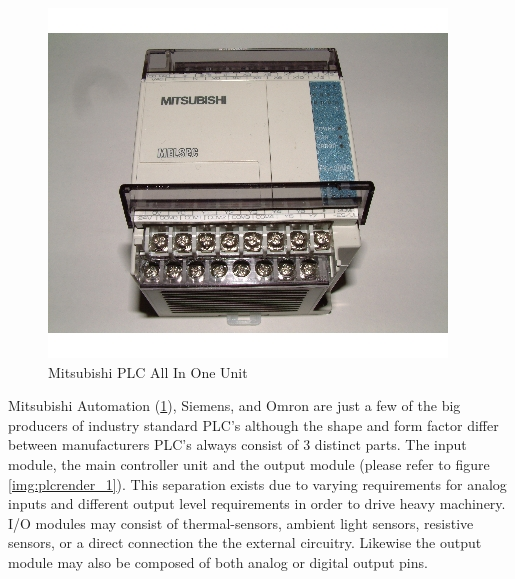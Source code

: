 \begin{figure}[htp]
    \centering
    \includegraphics[width=\imgsmlphoto]{./images/c01_mitsubishiplc.jpg}
    \caption{Mitsubishi PLC All In One Unit \cite{img_c01_MitsubishiPlc}}
    \label{img:mitsubishiplc}
\end{figure}
Mitsubishi Automation (\ref{img:mitsubishiplc}), Siemens, and Omron are just a few of the big producers of industry standard PLC's although the shape and form factor differ between manufacturers PLC's always consist of 3 distinct parts.  The input module, the main controller unit and the output module (please refer to figure \ref{img:plcrender_1}). This separation exists due to varying requirements for analog inputs and different output level requirements in order to drive heavy machinery. I/O modules may consist of thermal-sensors, ambient light sensors, resistive sensors, or a direct connection the the external circuitry. Likewise the output module may also be composed of both analog or digital output pins.
